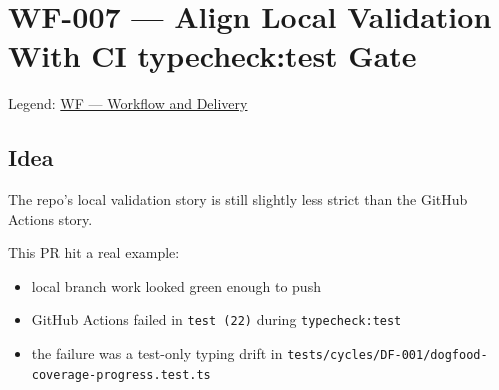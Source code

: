 \chapter{WF-007 --- Align Local Validation With CI typecheck:test Gate}\label{record-405}

\smallskip

Legend: \href{https://github.com/flyingrobots/bijou/blob/cbd70612140e7a450d764b3c7be1c6af878b99bc/docs/method/graveyard/legends/WF-workflow-and-delivery.md}{WF --- Workflow and Delivery}

\section{Idea}\label{record-405-idea}

The repo's local validation story is still slightly less strict than the GitHub Actions story.

This PR hit a real example:

\begin{itemize}
\tightlist
\item
  local branch work looked green enough to push
\item
  GitHub Actions failed in \texttt{t\allowbreak{}e\allowbreak{}s\allowbreak{}t\allowbreak{} \allowbreak{}(\allowbreak{}2\allowbreak{}2\allowbreak{})} during \texttt{t\allowbreak{}y\allowbreak{}p\allowbreak{}e\allowbreak{}c\allowbreak{}h\allowbreak{}e\allowbreak{}c\allowbreak{}k\allowbreak{}:\allowbreak{}t\allowbreak{}e\allowbreak{}s\allowbreak{}t}
\item
  the failure was a test-only typing drift in \texttt{t\allowbreak{}e\allowbreak{}s\allowbreak{}t\allowbreak{}s\allowbreak{}/\allowbreak{}c\allowbreak{}y\allowbreak{}c\allowbreak{}l\allowbreak{}e\allowbreak{}s\allowbreak{}/\allowbreak{}D\allowbreak{}F\allowbreak{}-\allowbreak{}0\allowbreak{}0\allowbreak{}1\allowbreak{}/\allowbreak{}d\allowbreak{}o\allowbreak{}g\allowbreak{}f\allowbreak{}o\allowbreak{}o\allowbreak{}d\allowbreak{}-\allowbreak{}c\allowbreak{}o\allowbreak{}v\allowbreak{}e\allowbreak{}r\allowbreak{}a\allowbreak{}g\allowbreak{}e\allowbreak{}-\allowbreak{}p\allowbreak{}r\allowbreak{}o\allowbreak{}g\allowbreak{}r\allowbreak{}e\allowbreak{}s\allowbreak{}s\allowbreak{}.\allowbreak{}t\allowbreak{}e\allowbreak{}s\allowbreak{}t\allowbreak{}.\allowbreak{}t\allowbreak{}s}
\end{itemize}

